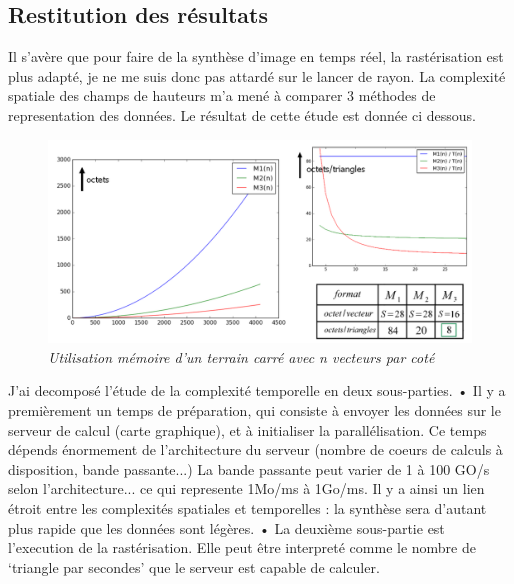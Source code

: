 \documentclass[12pt]{article}
\begin{document}
		\subsection{Restitution des résultats}
			Il s'avère que pour faire de la synthèse d'image en temps réel, la rastérisation est plus adapté, je ne me suis donc pas attardé sur le lancer de rayon.
			\newline
			La complexité spatiale des champs de hauteurs m'a mené à comparer 3 méthodes de representation des données. Le résultat de cette étude est donnée ci dessous.			
			\begin{figure}[!h]
				\begin{center}
					\includegraphics[width=\textwidth,height=\textheight,keepaspectratio]{../images/complexiteSpatial5.png}
				\end{center}
				\caption{\textit{Utilisation mémoire d'un terrain carré avec n vecteurs par coté}}
				\label{Utilisation mémoire du terrain}
			\end{figure}
			\newline
			J'ai decomposé l'étude de la complexité temporelle en deux sous-parties.
			\newline
			\newline
			• Il y a premièrement un temps de préparation, qui consiste à envoyer les données sur le serveur de calcul (carte graphique), et à initialiser la parallélisation.
			Ce temps dépends énormement de l'architecture du serveur (nombre de coeurs de calculs à disposition, bande passante...)
			La bande passante peut varier de 1 à 100 GO/s selon l'architecture... ce qui represente 1Mo/ms à 1Go/ms.
			Il y a ainsi un lien étroit entre les complexités spatiales et temporelles : la synthèse sera d'autant plus rapide que les données sont légères.
			\newline
			\newline
			• La deuxième sous-partie est l'execution de la rastérisation. Elle peut être interpreté comme le nombre de `triangle par secondes' que le serveur est capable de calculer.
			
\end{document}
